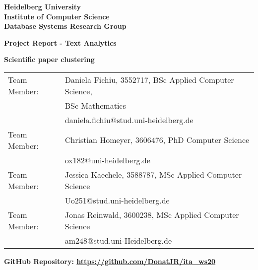 \documentclass[
     12pt,         %
     a4paper,      %
     BCOR10mm,     %
     DIV14,        %
     ]{article}
\begin{document}
\begin{titlepage}


\vspace*{1cm}
\begin{center}
\vspace*{3cm}
\textbf{ 
\Large Heidelberg University\\
\smallskip
\Large Institute of Computer Science\\
\smallskip
\Large Database Systems Research Group\\
\smallskip
}

\vspace{3cm}

\textbf{\large Project Report - Text Analytics}

\vspace{0.5\baselineskip}
{\huge
\textbf{Scientific paper clustering}
}
\end{center}

\vfill 

{\large
\begin{tabular}[l]{ll}
Team Member: & Daniela Fichiu, 3552717, BSc Applied Computer Science,\\
  & BSc Mathematics\\
  & daniela.fichiu@stud.uni-heidelberg.de\\
Team Member: & Christian Homeyer, 3606476, PhD Computer Science \\
  & ox182@uni-heidelberg.de\\
Team Member: & Jessica Kaechele, 3588787, MSc Applied Computer Science\\
  & Uo251@stud.uni-heidelberg.de\\
Team Member: & Jonas Reinwald, 3600238, MSc Applied Computer Science\\
  & am248@stud.uni-Heidelberg.de\\
  
\end{tabular}
}

{
  \textbf{GitHub Repository: \url{https://github.com/DonatJR/ita_ws20}}
}

\end{titlepage}


% 




\end{document}
